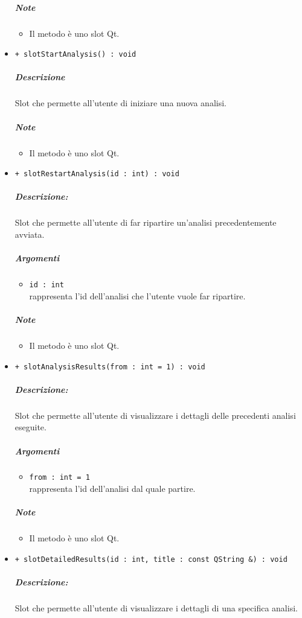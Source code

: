 \begin{itemize}
\begin{itemize}
			\end{itemize}
			\subparagraph{Note}
			\begin{itemize}
				\item Il metodo è uno slot\g{} Qt\g{}.
			\end{itemize}
			\item \color{blue} \verb!+ slotStartAnalysis() : void!
			\color{black}
			\subparagraph{Descrizione} Slot\g{} che permette all'utente di iniziare una nuova analisi.
			\subparagraph{Note}
			\begin{itemize}
				\item Il metodo è uno slot\g{} Qt\g{}.
			\end{itemize}
			\item \color{blue} \verb!+ slotRestartAnalysis(id : int) : void!
			\color{black}
			\subparagraph{Descrizione:} Slot\g{} che permette all'utente di far ripartire un'analisi precedentemente avviata.
			\color{black}
			\subparagraph{Argomenti}
			\begin{itemize}
				\item \color{RoyalPurple} \verb!id : int!\\				
\color{black} rappresenta l'id dell'analisi che l'utente vuole far ripartire.
			\end{itemize}
			\subparagraph{Note}
			\begin{itemize}
				\item Il metodo è uno slot\g{} Qt\g{}.
			\end{itemize}
			\item \color{blue} \verb!+ slotAnalysisResults(from : int = 1) : void!
			\color{black}
			\subparagraph{Descrizione:} Slot\g{} che permette all'utente di visualizzare i dettagli delle precedenti analisi eseguite.
			\color{black}
			\subparagraph{Argomenti}
			\begin{itemize}
				\item \color{RoyalPurple} \verb!from : int = 1!\\				
\color{black} rappresenta l'id dell'analisi dal quale partire.
			\end{itemize}
			\subparagraph{Note}
			\begin{itemize}
				\item Il metodo è uno slot\g{} Qt\g{}.
			\end{itemize}
			\item \color{blue} \verb!+ slotDetailedResults(id : int, title : const QString &) : void!
			\color{black}
			\subparagraph{Descrizione:} Slot\g{} che permette all'utente di visualizzare i dettagli di una specifica analisi.

\end{itemize}
